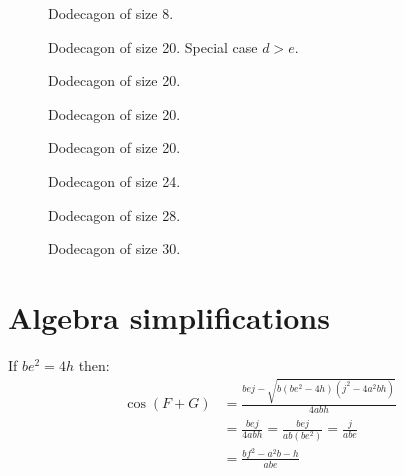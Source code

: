 \documentclass[11pt]{article}
\begin{document}
\begin{figure}[H]
\centering
{}
\caption{Dodecagon of size 8.}
\end{figure}

\begin{figure}[H]
\centering
{}
\caption{Dodecagon of size 20. Special case $d > e$.}
\end{figure}

\begin{figure}[H]
\centering
{}
\caption{Dodecagon of size 20.}
\end{figure}

\begin{figure}[H]
\centering
{}
\caption{Dodecagon of size 20.}
\end{figure}

\begin{figure}[H]
\centering
{}
\caption{Dodecagon of size 20.}
\end{figure}

\begin{figure}[H]
\centering
{}
\caption{Dodecagon of size 24.}
\end{figure}

\begin{figure}[H]
\centering
{}
\caption{Dodecagon of size 28.}
\end{figure}

\begin{figure}[H]
\centering
{}
\caption{Dodecagon of size 30.}
\end{figure}

\section{Algebra simplifications}
If $be^2 = 4h$ then:
\begin{align}
\cos{(F+G)} &= \frac{bej - \sqrt{b(be^2-4h)(j^2-4a^2bh)}}{4abh}\nonumber\\
 &= \frac{bej}{4abh} = \frac{bej}{ab(be^2)} = \frac{j}{abe}\nonumber\\
 &= \frac{bf^2 - a^2b - h}{abe}
\end{align}
\end{document}
